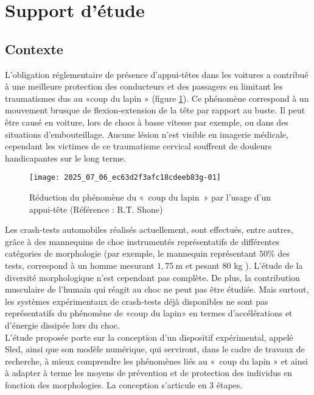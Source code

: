 
\section{Support d'étude \label{ccs_mp_2022_sec_1}}
\subsection{Contexte \label{ccs_mp_2022_sec_1A}}
\ifprof
\else
L'obligation réglementaire de présence d'appui-têtes dans les voitures a contribué à une meilleure protection des conducteurs et des passagers en limitant les traumatismes dus au «coup du lapin » (figure \ref{ccs_mp_2022_fig_01}). Ce phénomène correspond à un mouvement brusque de flexion-extension de la tête par rapport au buste. Il peut être causé en voiture, lors de chocs à basse vitesse par exemple, ou dans des situations d'embouteillage. Aucune lésion n'est visible en imagerie médicale, cependant les victimes de ce traumatisme cervical souffrent de douleurs handicapantes sur le long terme.\\

\begin{figure}[!h]
\centering
\texttt{[image: 2025\_07\_06\_ec63d2f3afc18cdeeb83g-01]}

\caption{Réduction du phénomène du «~coup du lapin~» par l'usage d'un appui-tête (Référence : R.T. Shone) \label{ccs_mp_2022_fig_01}}
\end{figure}

Les crash-tests automobiles réalisés actuellement, sont effectués, entre autres, grâce à des mannequins de choc instrumentés représentatifs de différentes catégories de morphologie (par exemple, le mannequin représentant $50 \%$ des tests, correspond à un homme mesurant $1,75 \mathrm{~m}$ et pesant 80 kg ). L'étude de la diversité morphologique n'est cependant pas complète. De plus, la contribution musculaire de l'humain qui réagit au choc ne peut pas être étudiée. Mais surtout, les systèmes expérimentaux de crash-tests déjà disponibles ne sont pas représentatifs du phénomène de «coup du lapin» en termes d'accélérations et d'énergie dissipée lors du choc.\\
L'étude proposée porte sur la conception d'un dispositif expérimental, appelé Sled, ainsi que son modèle numérique, qui serviront, dans le cadre de travaux de recherche, à mieux comprendre les phénomènes liés au «~coup du lapin » et ainsi à adapter à terme les moyens de prévention et de protection des individus en fonction des morphologies. La conception s'articule en 3 étapes.

